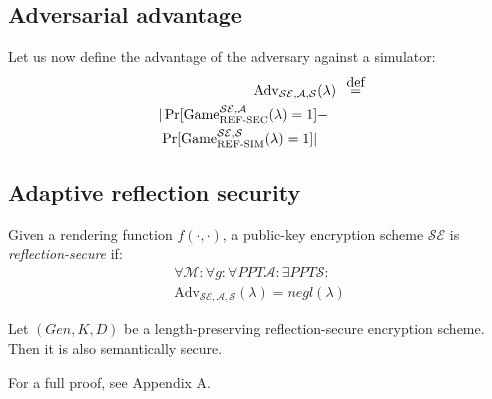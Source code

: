 \subsection{Adversarial advantage}\label{subsec:refsecadv}

Let us now define the advantage of the adversary against a simulator:
\begin{align*}
    \text{Adv}_{\mathcal{SE}, \mathcal{A}, \mathcal{S}}&(\lambda) &\defeq\\
    |\Pr[\text{Game}_{\text{REF-SEC}}^{\mathcal{SE},\mathcal{A}}(\lambda) = 1] &-\\
    \Pr[\text{Game}_{\text{REF-SIM}}^{\mathcal{SE},\mathcal{S}}(\lambda) = 1]| &
\end{align*}

\subsection{Adaptive reflection security}\label{subsec:adaptiverefsec}

Given a rendering function $f(\cdot, \cdot)$, a public-key encryption
scheme $\mathcal{SE}$ is \textit{reflection-secure} if:
\begin{align*}
    \forall \mathcal{M}:
    \forall g:
    \forall PPT \mathcal{A}:
    \exists PPT \mathcal{S}:\\
    \text{Adv}_{\mathcal{SE}, \mathcal{A}, \mathcal{S}}(\lambda) = negl(\lambda)
\end{align*}

\begin{lemma}
    Let $(Gen, K, D)$ be a length-preserving reflection-secure encryption
    scheme. Then it is also semantically secure.
\end{lemma}

For a full proof, see Appendix A.
